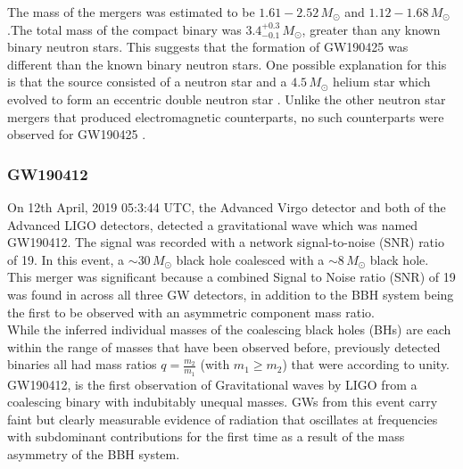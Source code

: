 The mass of the mergers was estimated to be $1.61-2.52\,M_\odot$ and $1.12 - 1.68\,M_\odot$.The total mass of the compact binary was $3.4_{-0.1}^{+0.3}\, M_\odot$, greater than any known binary neutron stars. This suggests that the formation of GW190425 was different than the known binary neutron stars. One possible explanation for this is that the source consisted of a neutron star and a $4.5\,M_\odot$ helium star which evolved to form an eccentric double neutron star \cite{Romero_Shaw_2020}. Unlike the other neutron star mergers that produced electromagnetic counterparts, no such counterparts were observed for GW190425 \cite{GW190425_1}.

\pagebreak

\subsubsection{GW190412}

On 12th April, 2019 05:3:44 UTC, the Advanced Virgo detector and both of the Advanced LIGO detectors, detected a gravitational wave which was named GW190412. The signal was recorded with a network signal-to-noise (SNR) ratio of 19. In this event, a $\sim 30\, M_\odot$ black hole coalesced with a $\sim 8\,M_\odot$ black hole. This merger was significant because a combined Signal to Noise ratio (SNR) of 19 was found in across all three GW detectors, in addition to the BBH system being the first to be observed with an asymmetric component mass ratio. \cite{GW190412} \\

While the inferred individual masses of the coalescing black holes (BHs) are each within the range of masses that have been observed before, previously detected binaries all had mass ratios $ q = \frac{m_2}{m_1}$ (with $m_1 \geq m_2$) that were according to unity. GW190412, is the first observation of Gravitational waves by LIGO from a coalescing binary with indubitably unequal masses. GWs from this event carry faint but clearly measurable evidence of radiation that oscillates at frequencies with subdominant contributions for the first time as a result of the mass asymmetry of the BBH system.

